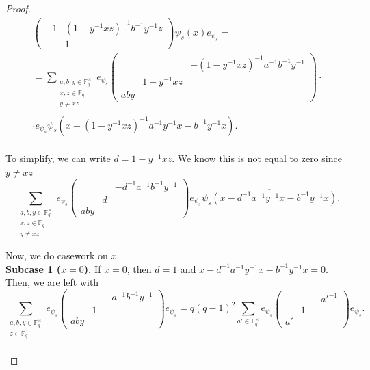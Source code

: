\documentclass[12pt,reqno]{amsart}
\theoremstyle{definition}
\theoremstyle{remark}
\numberwithin{equation}{section}
\begin{document}
\begin{proof}
\begin{align*}
\begin{pmatrix}
        & 1 & (1-y^{-1}xz)^{-1}b^{-1}y^{-1}z\\
        & & 1
    \end{pmatrix} \overline{\psi_s(x)} e_{\psi_s}=\\
    = \sum_{\substack{a, b, y \in \mathbb{F}_q^\times\\x, z \in \mathbb{F}_q\\y \ne xz}}e_{\psi_s} \begin{pmatrix}
        & & -(1-y^{-1}xz)^{-1}a^{-1}b^{-1}y^{-1}\\
        & 1-y^{-1}xz & \\
        aby & &
    \end{pmatrix} \cdot \\ \cdot e_{\psi_s} \overline{\psi_s(x-(1-y^{-1}xz)^{-1}a^{-1}y^{-1}x-b^{-1}y^{-1}x)}.
    \end{align*}\\
    
    To simplify, we can write $d = 1-y^{-1}xz$. We know this is not equal to zero since $y \ne xz$
    \begin{equation*}
        \sum_{\substack{a, b, y \in \mathbb{F}_q^\times\\x, z \in \mathbb{F}_q\\ y \ne xz}}e_{\psi_s} \begin{pmatrix}
        & & -d^{-1}a^{-1}b^{-1}y^{-1}\\
        & d & \\
        aby & &
    \end{pmatrix} e_{\psi_s} \overline{\psi_s(x-d^{-1}a^{-1}y^{-1}x-b^{-1}y^{-1}x)}.
    \end{equation*}

    Now, we do casework on $x$.\\

    \textbf{Subcase 1 ($x = 0$).} If $x = 0$, then $d = 1$ and $x-d^{-1}a^{-1}y^{-1}x-b^{-1}y^{-1}x = 0$. Then, we are left with
    \begin{equation*}
        \sum_{\substack{a, b, y \in \mathbb{F}_q^\times\\z \in \mathbb{F}_q}} e_{\psi_s} \begin{pmatrix}
            & & -a^{-1}b^{-1}y^{-1}\\
            & 1 &\\
            aby & &
        \end{pmatrix}e_{\psi_s} = q(q-1)^2 \sum_{a' \in \mathbb{F}_q^\times} e_{\psi_s} \begin{pmatrix}
            & & -a'^{-1}\\
            & 1 &\\
            a' & &
        \end{pmatrix} e_{\psi_s}.
    \end{equation*}\\
    

\end{proof}
\end{document}
